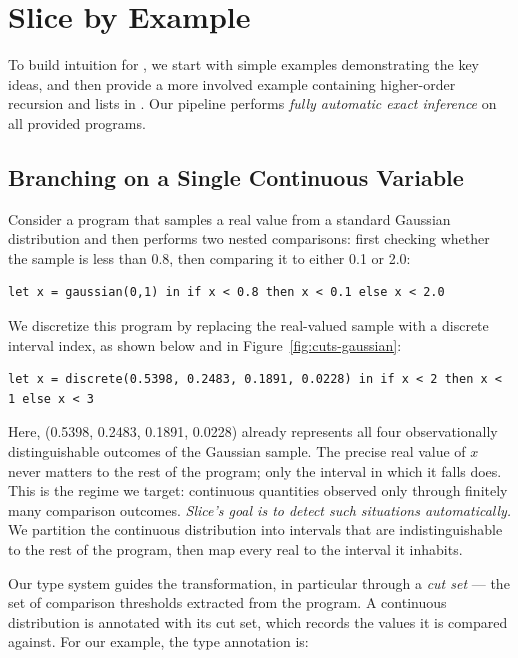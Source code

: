 

\section{Slice by Example}\label{sec:examples}
To build intuition for \Slice{}, we start with simple examples demonstrating the key ideas, and then provide a more involved example containing higher-order recursion and lists in . Our pipeline performs \emph{fully automatic exact inference} on all provided programs.

\subsection{Branching on a Single Continuous Variable}\label{sec:examples:1}
Consider a program that samples a real value from a standard Gaussian distribution and then performs two nested comparisons: first checking whether the sample is less than 0.8, then comparing it to either 0.1 or 2.0:

\begin{lstlisting}[aboveskip=1em,belowskip=1em,gobble=4]
    let x = gaussian(0,1) in if x < 0.8 then x < 0.1 else x < 2.0
\end{lstlisting}

\noindent We discretize this program by replacing the real-valued sample with a discrete interval index, as shown below and in Figure~\ref{fig:cuts-gaussian}:



\begin{lstlisting}[aboveskip=1em,belowskip=1em,gobble=4]
    let x = discrete(0.5398, 0.2483, 0.1891, 0.0228) in if x < 2 then x < 1 else x < 3
\end{lstlisting}

\noindent Here, \discrete(0.5398, 0.2483, 0.1891, 0.0228) already represents all four observationally distinguishable outcomes of the Gaussian sample. The precise real value of $x$ never matters to the rest of the program; only the interval in which it falls does. This is the regime we target: continuous quantities observed only through finitely many comparison outcomes. \emph{Slice’s goal is to detect such situations automatically.} We partition the continuous distribution into intervals that are indistinguishable to the rest of the program, then map every real to the interval it inhabits.

Our type system guides the transformation, in particular through a \emph{cut set} --- the set of comparison thresholds extracted from the program. A continuous distribution is annotated with its cut set, which records the values it is compared against. For our example, the type annotation is:

